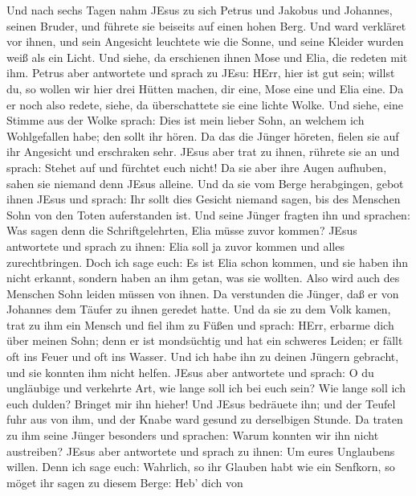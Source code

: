  Und nach sechs Tagen nahm JEsus zu sich Petrus und Jakobus
und Johannes, seinen Bruder, und führete sie beiseits auf einen hohen
Berg.  Und ward verkläret vor ihnen, und sein Angesicht
leuchtete wie die Sonne, und seine Kleider wurden weiß als ein Licht.
 Und siehe, da erschienen ihnen Mose und Elia, die redeten
mit ihm.  Petrus aber antwortete und sprach zu JEsu: HErr,
hier ist gut sein; willst du, so wollen wir hier drei Hütten machen, dir
eine, Mose eine und Elia eine.  Da er noch also redete,
siehe, da überschattete sie eine lichte Wolke. Und siehe, eine Stimme
aus der Wolke sprach: Dies ist mein lieber Sohn, an welchem ich
Wohlgefallen habe; den sollt ihr hören.  Da das die Jünger
höreten, fielen sie auf ihr Angesicht und erschraken sehr. 
JEsus aber trat zu ihnen, rührete sie an und sprach: Stehet auf und
fürchtet euch nicht!  Da sie aber ihre Augen aufhuben, sahen
sie niemand denn JEsus alleine.  Und da sie vom Berge
herabgingen, gebot ihnen JEsus und sprach: Ihr sollt dies Gesicht
niemand sagen, bis des Menschen Sohn von den Toten auferstanden ist.
 Und seine Jünger fragten ihn und sprachen: Was sagen denn
die Schriftgelehrten, Elia müsse zuvor kommen?  JEsus
antwortete und sprach zu ihnen: Elia soll ja zuvor kommen und alles
zurechtbringen.  Doch ich sage euch: Es ist Elia schon
kommen, und sie haben ihn nicht erkannt, sondern haben an ihm getan, was
sie wollten. Also wird auch des Menschen Sohn leiden müssen von ihnen.
 Da verstunden die Jünger, daß er von Johannes dem Täufer
zu ihnen geredet hatte.  Und da sie zu dem Volk kamen, trat
zu ihm ein Mensch und fiel ihm zu Füßen  und sprach: HErr,
erbarme dich über meinen Sohn; denn er ist mondsüchtig und hat ein
schweres Leiden; er fällt oft ins Feuer und oft ins Wasser.
 Und ich habe ihn zu deinen Jüngern gebracht, und sie
konnten ihm nicht helfen.  JEsus aber antwortete und
sprach: O du ungläubige und verkehrte Art, wie lange soll ich bei euch
sein? Wie lange soll ich euch dulden? Bringet mir ihn hieher!
 Und JEsus bedräuete ihn; und der Teufel fuhr aus von ihm,
und der Knabe ward gesund zu derselbigen Stunde.  Da traten
zu ihm seine Jünger besonders und sprachen: Warum konnten wir ihn nicht
austreiben?  JEsus aber antwortete und sprach zu ihnen: Um
eures Unglaubens willen. Denn ich sage euch: Wahrlich, so ihr Glauben
habt wie ein Senfkorn, so möget ihr sagen zu diesem Berge: Heb' dich von
